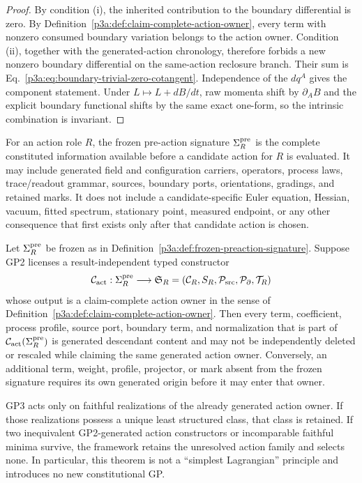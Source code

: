 \documentclass[12pt,a4paper]{article}
\begin{document}
\begin{proof}
By condition (i), the inherited contribution to the boundary differential is
zero.  By Definition~\ref{p3a:def:claim-complete-action-owner}, every term with
nonzero consumed boundary variation belongs to the action owner.  Condition
(ii), together with the generated-action chronology, therefore forbids a new
nonzero boundary differential on the same-action reclosure branch.  Their sum
is Eq.~\eqref{p3a:eq:boundary-trivial-zero-cotangent}.  Independence of the
\(dq^A\) gives the component statement.  Under
\(L\mapsto L+dB/dt\), raw momenta shift by \(\partial_A B\) and the explicit
boundary functional shifts by the same exact one-form, so the intrinsic
combination is invariant.
\end{proof}

\begin{definition}
\label{p3a:def:frozen-preaction-signature}
For an action role $R$, the frozen pre-action signature
$\Sigma_R^{\rm pre}$ is the complete constituted information available before
a candidate action for $R$ is evaluated.  It may include generated field and
configuration carriers, operators, process laws, trace/readout grammar,
sources, boundary ports, orientations, gradings, and retained marks.  It does
not include a candidate-specific Euler equation, Hessian, vacuum, fitted
spectrum, stationary point, measured endpoint, or any other consequence that
first exists only after that candidate action is chosen.
\end{definition}

\begin{theorem}
\label{p3a:thm:generated-action-constructor-closure}
Let $\Sigma_R^{\rm pre}$ be frozen as in
Definition~\ref{p3a:def:frozen-preaction-signature}.  Suppose GP2 licenses a
result-independent typed constructor
\[
 \mathcal C_{\rm act}:\Sigma_R^{\rm pre}\longrightarrow
 \mathfrak S_R
 =(\mathcal C_R,S_R,\mathcal P_{\rm src},\mathcal P_{\partial},
   \mathcal T_R)
\]
whose output is a claim-complete action owner in the sense of
Definition~\ref{p3a:def:claim-complete-action-owner}.  Then every term,
coefficient, process profile, source port, boundary term, and normalization
that is part of $\mathcal C_{\rm act}(\Sigma_R^{\rm pre})$ is generated
descendant content and may not be independently deleted or rescaled while
claiming the same generated action owner.  Conversely, an additional term,
weight, profile, projector, or mark absent from the frozen signature requires
its own generated origin before it may enter that owner.

GP3 acts only on faithful realizations of the already generated action owner.
If those realizations possess a unique least structured class, that class is
retained.  If two inequivalent GP2-generated action constructors or
incomparable faithful minima survive, the framework retains the unresolved
action family and selects none.  In particular, this theorem is not a
``simplest Lagrangian'' principle and introduces no new constitutional GP.
\end{theorem}
\end{document}
